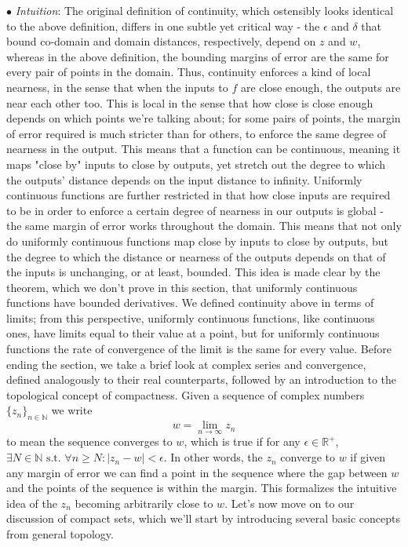 \documentclass{article}
\newcommand*{\nn}{\newline \newline}
\newcommand*{\In}{\indent \ensuremath{\bullet} \textit{Intuition}: }
\newcommand*{\N}{\mathbb{N}}
\newcommand*{\R}{\mathbb{R}}
\newcommand*{\st}{\text{ s.t. }}
\begin{document}
\In The original definition of continuity, which ostensibly looks identical to the above definition, differs in one subtle yet critical way - the $ \epsilon $ and $ \delta $ that bound co-domain and domain distances, respectively, depend on $ z $ and $ w $, whereas in the above definition, the bounding margins of error are the same for every pair of points in the domain. Thus, continuity enforces a kind of local nearness, in the sense that when the inputs to $ f $ are close enough, the outputs are near each other too. This is local in the sense that how close is close enough depends on which points we're talking about; for some pairs of points, the margin of error required is much stricter than for others, to enforce the same degree of nearness in the output. This means that a function can be continuous, meaning it maps "close by" inputs to close by outputs, yet stretch out the degree to which the outputs' distance depends on the input distance to infinity. Uniformly continuous functions are further restricted in that how close inputs are required to be in order to enforce a certain degree of nearness in our outputs is global - the same margin of error works throughout the domain. This means that not only do uniformly continuous functions map close by inputs to close by outputs, but the degree to which the distance or nearness of the outputs depends on that of the inputs is unchanging, or at least, bounded. This idea is made clear by the theorem, which we don't prove in this section, that uniformly continuous functions have bounded derivatives. We defined continuity above in terms of limits; from this perspective, uniformly continuous functions, like continuous ones, have limits equal to their value at a point, but for uniformly continuous functions the rate of convergence of the limit is the same for every value.
\nn
Before ending the section, we take a brief look at complex series and convergence, defined analogously to their real counterparts, followed by an introduction to the topological concept of compactness. Given a sequence of complex numbers $ \{ z_n \}_{n \in \N} $ we write
$$ w = \lim_{n \to \infty} z_n $$
to mean the sequence converges to $ w $, which is true if for any $ \epsilon \in \R^+ $, $ \exists N \in \N \st \forall n \geq N: | z_n - w | < \epsilon $. In other words, the $ z_n $ converge to $ w $ if given any margin of error we can find a point in the sequence where the gap between $ w $ and the points of the sequence is within the margin. This formalizes the intuitive idea of the $ z_n $ becoming arbitrarily close to $ w $.
\nn
Let's now move on to our discussion of compact sets, which we'll start by introducing several basic concepts from general topology.
\end{document}
